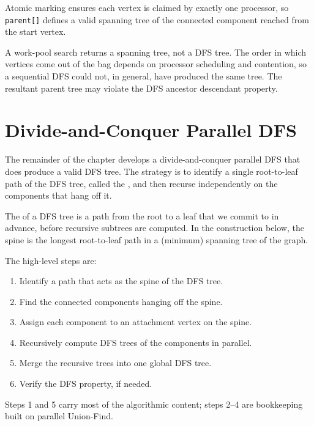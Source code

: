 Atomic marking ensures each vertex is claimed by exactly one processor,
so \texttt{parent[]} defines a valid spanning tree of the connected
component reached from the start vertex.

\begin{pppitfall}
A work-pool search returns a spanning tree, not a DFS tree.
The order in which vertices come out of the bag depends on processor
scheduling and contention, so a sequential DFS could not, in general,
have produced the same tree. The resultant parent tree may violate the DFS ancestor descendant property.
\end{pppitfall}

\section{Divide-and-Conquer Parallel DFS}
\label{sec:dfs-divide-conquer}

The remainder of the chapter develops a divide-and-conquer parallel DFS
that does produce a valid DFS tree.
The strategy is to identify a single root-to-leaf path of the DFS
tree, called the , and then recurse independently on the
components that hang off it.

\begin{ppdefn}
The  of a DFS tree is a path from the root to a leaf
that we commit to in advance, before recursive subtrees are computed.
In the construction below, the spine is the longest root-to-leaf path
in a (minimum) spanning tree of the graph.
\end{ppdefn}

\begin{ppnote}
The high-level steps are:
\begin{enumerate}
  \item Identify a path that acts as the spine of the DFS tree.
  \item Find the connected components hanging off the spine.
  \item Assign each component to an attachment vertex on the spine.
  \item Recursively compute DFS trees of the components in parallel.
  \item Merge the recursive trees into one global DFS tree.
  \item Verify the DFS property, if needed.
\end{enumerate}
Steps 1 and 5 carry most of the algorithmic content; steps 2--4 are
bookkeeping built on parallel Union-Find.
\end{ppnote}

